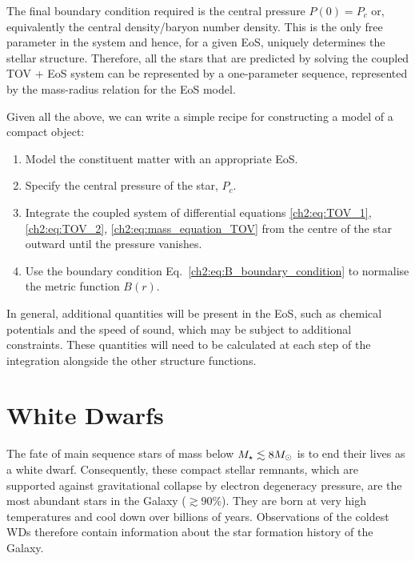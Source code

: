 The final boundary condition required is the central pressure $P(0) = P_c$ or, equivalently the central density/baryon number density. This is the only free parameter in the system and hence, for a given EoS, uniquely determines the stellar structure. Therefore, all the stars that are predicted by solving the coupled TOV + EoS system can be represented by a one-parameter sequence, represented by the mass-radius relation for the EoS model.


Given all the above, we can write a simple recipe for constructing a model of a compact object:
\begin{enumerate}
    \item Model the constituent matter with an appropriate EoS.
    \item Specify the central pressure of the star, $P_c$.
    \item Integrate the coupled system of differential equations \ref{ch2:eq:TOV_1}, \ref{ch2:eq:TOV_2}, \ref{ch2:eq:mass_equation_TOV} from the centre of the star outward until the pressure vanishes.
    \item Use the boundary condition Eq.~\ref{ch2:eq:B_boundary_condition} to normalise the metric function $B(r)$. 
\end{enumerate}
In general, additional quantities will be present in the EoS, such as chemical potentials and the speed of sound, which may be subject to additional constraints. These quantities will need to be calculated at each step of the integration alongside the other structure functions. 

\section{White Dwarfs}
\label{ch2:sec:white_dwarfs}

The fate of main sequence stars of mass below $M_\star \lesssim 8 M_\odot$ is to end their lives as a white dwarf. Consequently, these compact stellar remnants, which are supported against gravitational collapse by electron degeneracy pressure, are the most abundant stars in the Galaxy ($\gtrsim 90\%$). They are born at very high temperatures and cool down over billions of years. Observations of the coldest WDs therefore contain information about the star formation history of the Galaxy.

